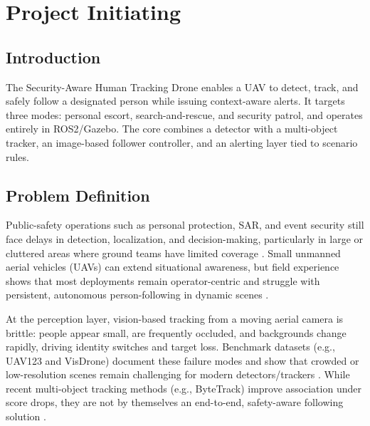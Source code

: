 \documentclass[12pt,a4paper]{report}
\begin{document}
\cleardoublepage{}
{}
\listoffigures

\cleardoublepage{}
{}
\listoftables
\clearpage


\setcounter{section}{0}

\chapter{Project Initiating}


\section{Introduction}
The Security-Aware Human Tracking Drone enables a \ac{UAV} to detect, track, and safely follow a designated person while issuing context-aware alerts. It targets three modes: personal escort, search-and-rescue, and security patrol, and operates entirely in \ac{ROS2}/Gazebo. The core combines a detector with a multi-object tracker, an image-based follower controller, and an alerting layer tied to scenario rules.



\section{Problem Definition}
\noindent
Public-safety operations such as personal protection, \ac{SAR}, and event security still face delays in detection, localization, and decision-making, particularly in large or cluttered areas where ground teams have limited coverage \citep{Goodrich2008JFR}. Small unmanned aerial vehicles (\ac{UAV}s) can extend situational awareness, but field experience shows that most deployments remain operator-centric and struggle with persistent, autonomous person-following in dynamic scenes \citep{Goodrich2008JFR}.

At the perception layer, vision-based tracking from a moving aerial camera is brittle: people appear small, are frequently occluded, and backgrounds change rapidly, driving identity switches and target loss. Benchmark datasets (e.g., UAV123 and VisDrone) document these failure modes and show that crowded or low-resolution scenes remain challenging for modern detectors/trackers \citep{Mueller2016UAV123,Zhu2021VisDrone}. While recent multi-object tracking methods (e.g., ByteTrack) improve association under score drops, they are not by themselves an end-to-end, safety-aware following solution \citep{Zhang2022ByteTrack}.
\end{document}
